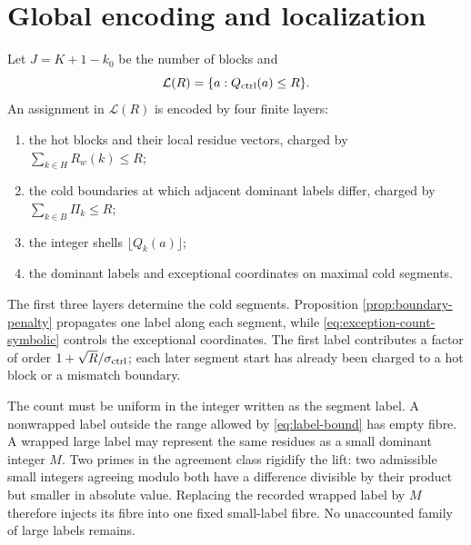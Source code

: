 \section{Global encoding and localization}\label{sec:global}

Let $J=K+1-k_0$ be the number of blocks and
\[
 \mathcal L(R)=\{a:Q_{\mathrm{ctrl}}(a)\le R\}.
\]
An assignment in $\mathcal L(R)$ is encoded by four finite layers:
\begin{enumerate}[label=(\arabic*)]
\item the hot blocks and their local residue vectors, charged by
      $\sum_{k\in H}R_w(k)\le R$;
\item the cold boundaries at which adjacent dominant labels differ, charged by
      $\sum_{k\in B}\Pi_k\le R$;
\item the integer shells $\lfloor Q_k(a)\rfloor$;
\item the dominant labels and exceptional coordinates on maximal cold segments.
\end{enumerate}
The first three layers determine the cold segments.  Proposition
\ref{prop:boundary-penalty} propagates one label along each segment, while
\eqref{eq:exception-count-symbolic} controls the exceptional coordinates.
The first label contributes a factor of order
$1+\sqrt R/\sigma_{\mathrm{ctrl}}$; each later segment start has already been charged to a hot
block or a mismatch boundary.

The count must be uniform in the integer written as the segment label.  A
nonwrapped label outside the range allowed by \eqref{eq:label-bound} has empty
fibre.  A wrapped large label may represent the same residues as a small
dominant integer $M$.  Two primes in the agreement class rigidify the lift: two
admissible small integers agreeing modulo both have a difference divisible by
their product but smaller in absolute value.  Replacing the recorded wrapped
label by $M$ therefore injects its fibre into one fixed small-label fibre.  No
unaccounted family of large labels remains.

